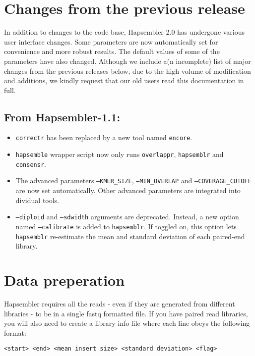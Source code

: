 \documentclass[12pt,a4paper]{report}
\newcommand{\hapversion}{2.0}
\begin{document}
\section{Changes from the previous release}

In addition to changes to the code base, Hapsembler \hapversion{} has undergone various user interface changes. Some parameters are now automatically set for convenience and more robust results. The default values of some of the parameters have also changed. Although we include a(n incomplete) list of major changes from the previous releases below, due to the high volume of modification and additions, we kindly request that our old users read this documentation in full.

\subsection{From Hapsembler-1.1:}

\begin{itemize}
\item \texttt{correctr} has been replaced by a new tool named \texttt{encore}.
\item \texttt{hapsemble} wrapper script now only runs \texttt{overlappr}, \texttt{hapsemblr} and \texttt{consensr}.
\item The advanced parameters \texttt{--KMER\_SIZE}, \texttt{--MIN\_OVERLAP} and \texttt{--COVERAGE\_CUTOFF} are now set automatically. Other advanced parameters are integrated into dividual tools.
\item \texttt{--diploid} and \texttt{--sdwidth} arguments are deprecated. Instead, a new option named \texttt{--calibrate} is added to \texttt{hapsemblr}. If toggled on, this option lets \texttt{hapsemblr} re-estimate the mean and standard deviation of each paired-end library.
\end{itemize}

\section{Data preperation}
\label{data}

Hapsembler requires all the reads - even if they are generated from different libraries - to be in a single fastq formatted file. If you have paired read libraries, you will also need to create a library info file where each line obeys the following format:

\begin{verbatim}
<start> <end> <mean insert size> <standard deviation> <flag>
\end{verbatim}
\end{document}
